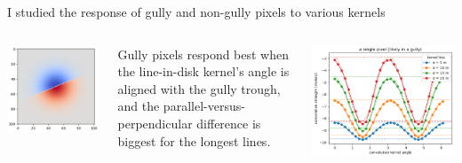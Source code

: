 \documentclass[aspectratio=169]{beamer}
\begin{document}
\begin{frame}{I studied the response of gully and non-gully pixels to various kernels}
\begin{columns}
\begin{minipage}{0.5\linewidth}
\vspace{0.15 cm}
\includegraphics[width=\linewidth]{img/cliff-edge-kernel.png}
\end{minipage}

Gully pixels respond best when the line-in-disk kernel's angle is aligned with the gully trough, and the parallel-versus-perpendicular difference is biggest for the longest lines.

\vspace{0.25 cm}
\includegraphics[width=\linewidth]{img/response-to-line-in-disk-convolution.png}
\end{columns}
\end{frame}
\end{document}
